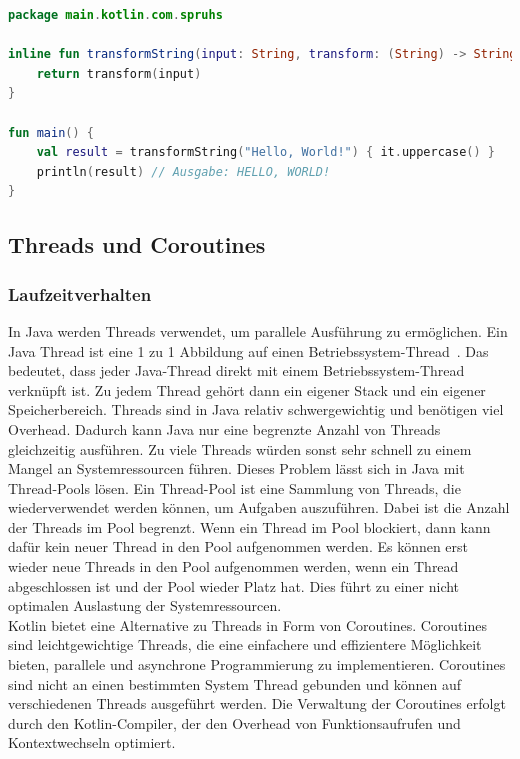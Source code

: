 \documentclass[11pt]{article}
\begin{document}
    \begin{lstlisting}[language=Kotlin, caption={InlineFunction.java}, label={kotlin-inline-function}]
package main.kotlin.com.spruhs

inline fun transformString(input: String, transform: (String) -> String): String {
    return transform(input)
}

fun main() {
    val result = transformString("Hello, World!") { it.uppercase() }
    println(result) // Ausgabe: HELLO, WORLD!
}
    \end{lstlisting}

    \subsection{Threads und Coroutines}

    \subsubsection{Laufzeitverhalten}
    In Java werden Threads verwendet, um parallele Ausführung zu ermöglichen.
    Ein Java Thread ist eine 1 zu 1 Abbildung auf einen Betriebssystem-Thread~\cite[940]{insel}.
    Das bedeutet, dass jeder Java-Thread direkt mit einem Betriebssystem-Thread verknüpft ist.
    Zu jedem Thread gehört dann ein eigener Stack und ein eigener Speicherbereich.
    Threads sind in Java relativ schwergewichtig und benötigen viel Overhead.
    Dadurch kann Java nur eine begrenzte Anzahl von Threads gleichzeitig ausführen.
    Zu viele Threads würden sonst sehr schnell zu einem Mangel an Systemressourcen führen.
    Dieses Problem lässt sich in Java mit Thread-Pools lösen.
    Ein Thread-Pool ist eine Sammlung von Threads, die wiederverwendet werden können, um Aufgaben auszuführen.
    Dabei ist die Anzahl der Threads im Pool begrenzt.
    Wenn ein Thread im Pool blockiert, dann kann dafür kein neuer Thread in den Pool aufgenommen werden.
    Es können erst wieder neue Threads in den Pool aufgenommen werden, wenn ein Thread abgeschlossen ist und der Pool wieder Platz hat.
    Dies führt zu einer nicht optimalen Auslastung der Systemressourcen.\\
    Kotlin bietet eine Alternative zu Threads in Form von Coroutines.
    Coroutines sind leichtgewichtige Threads, die eine einfachere und effizientere Möglichkeit bieten, parallele und asynchrone Programmierung zu implementieren.
    Coroutines sind nicht an einen bestimmten System Thread gebunden und können auf verschiedenen Threads ausgeführt werden.
    Die Verwaltung der Coroutines erfolgt durch den Kotlin-Compiler, der den Overhead von Funktionsaufrufen und Kontextwechseln optimiert.
\end{document}
